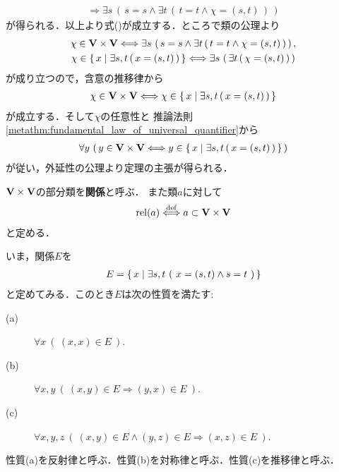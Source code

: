 \begin{prf}
\begin{align}
			\Longrightarrow \exists s\, \left(\, s = s \wedge \exists t\, (\, t=t \wedge \chi=(s,t)\, )\, \right)
		\end{align}
		が得られる．以上より式()が成立する．ところで類の公理より
		\begin{align}
			\begin{gathered}
				\chi \in \mathbf{V} \times \mathbf{V} \Longleftrightarrow \exists s\, \left(\, s = s \wedge \exists t\, (\, t=t \wedge \chi=(s,t)\, )\, \right), \\
				\chi \in \left\{\, x \mid \exists s,t\, (\, x=(s,t)\, )\, \right\} \Longleftrightarrow
				\exists s\, \left(\, \exists t\, (\, \chi=(s,t)\, )\, \right)
			\end{gathered}
		\end{align}
		が成り立つので，含意の推移律から
		\begin{align}
			\chi \in \mathbf{V} \times \mathbf{V} \Longleftrightarrow \chi \in \left\{\, x \mid \exists s,t\, (\, x=(s,t)\, )\, \right\}
		\end{align}
		が成立する．そして$\chi$の任意性と
		推論法則\ref{metathm:fundamental_law_of_universal_quantifier}から
		\begin{align}
			\forall y\, \left(\, y \in \mathbf{V} \times \mathbf{V} \Longleftrightarrow y \in \left\{\, x \mid \exists s,t\, (\, x=(s,t)\, )\, \right\}\, \right)
		\end{align}
		が従い，外延性の公理より定理の主張が得られる．
		\QED
	\end{prf}
	
	\begin{screen}
		\begin{dfn}[関係]
			$\mathbf{V} \times \mathbf{V}$の部分類を{\bf 関係}と呼ぶ．
			また類$a$に対して
			\begin{align}
				\operatorname*{rel} (a) \overset{\mathrm{def}}{\Longleftrightarrow} a \subset \mathbf{V} \times \mathbf{V}
			\end{align}
			と定める．
		\end{dfn}
	\end{screen}
	
	いま，関係$E$を
	\begin{align}
		E = \left\{\, x \mid \exists s,t\ (\ x=(s,t) \wedge s = t\ )\, \right\}
	\end{align}
	と定めてみる．このとき$E$は次の性質を満たす:
	\begin{description}
		\item[(a)] $\forall x\ (\ (x,x) \in E\ )$.
		\item[(b)] $\forall x,y\ (\ (x,y) \in E \Longrightarrow (y,x) \in E\ )$.
		\item[(c)] $\forall x,y,z\ (\ (x,y) \in E \wedge (y,z) \in E \Longrightarrow (x,z) \in E\ )$.
	\end{description}
	性質(a)を反射律と呼ぶ．性質(b)を対称律と呼ぶ．性質(c)を推移律と呼ぶ．
	
